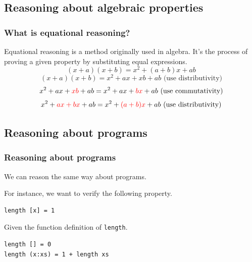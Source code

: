 \documentclass{beamer}
\begin{document}
\subsection{Reasoning about algebraic properties}

\begin{frame}
  \frametitle{What is equational reasoning?}

Equational reasoning is a method originally used in algebra.
 It's the process of proving a given property by substituting equal expressions. 
\begin{equation*}
  \label{eq:sum}
  (x+a)(x+b) = x^2 + (a+b)x+ab
\end{equation*}
\pause
\begin{equation*}
  (x+a)(x+b) = x^2 + ax + xb + ab \text{     (use distributivity)}
\end{equation*}
\pause
\begin{equation*}
x^2 + ax + {\color{red} xb} + ab = x^2 + ax + {\color{red} bx} + ab \text{     (use commutativity)}
\end{equation*}
\pause
\begin{equation*}
x^2 + {\color{red} ax + bx} + ab = x^2 + {\color{red}(a + b)x} + ab \text{     (use distributivity)}
\end{equation*}
\end{frame}

\subsection{Reasoning about programs}

\begin{frame}[fragile]
  \frametitle{Reasoning about programs}
  We can reason the same way about programs.

For instance, we want to verify the following property.
\begin{verbatim}
length [x] = 1
\end{verbatim}
Given the function definition of \verb|length|.
\begin{verbatim}
length [] = 0
length (x:xs) = 1 + length xs  
\end{verbatim}
\end{frame}
\end{document}
